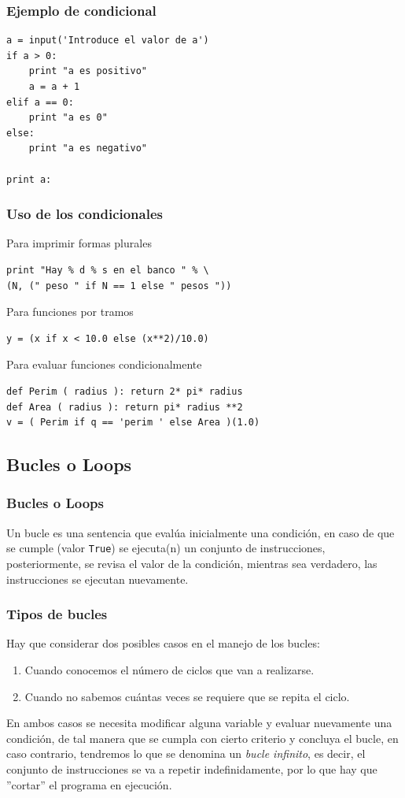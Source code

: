 \begin{frame}[fragile]
\frametitle{Ejemplo de condicional}
\begin{lstlisting}
a = input('Introduce el valor de a')
if a > 0:
    print "a es positivo"
    a = a + 1
elif a == 0:
    print "a es 0"
else:
    print "a es negativo"

print a:
\end{lstlisting}
\end{frame}
\begin{frame}[fragile]
\frametitle{Uso de los condicionales}
Para imprimir formas plurales
\begin{lstlisting}
print "Hay % d % s en el banco " % \
(N, (" peso " if N == 1 else " pesos "))
\end{lstlisting}
\pause
Para funciones por tramos
\begin{lstlisting}
y = (x if x < 10.0 else (x**2)/10.0)
\end{lstlisting}
\pause
Para evaluar funciones condicionalmente
\begin{lstlisting}
def Perim ( radius ): return 2* pi* radius
def Area ( radius ): return pi* radius **2
v = ( Perim if q == 'perim ' else Area )(1.0)
\end{lstlisting}
\end{frame}
\subsection{Bucles o Loops}
\begin{frame}
\frametitle{Bucles o Loops}
Un bucle es una sentencia que evalúa inicialmente una condición, en caso de que se cumple (valor \texttt{True}) se ejecuta(n) un conjunto de instrucciones, posteriormente, se revisa el valor de la condición, mientras sea verdadero, las instrucciones se ejecutan nuevamente.
\end{frame}
\begin{frame}
\frametitle{Tipos de bucles}
Hay que considerar dos posibles casos en el manejo de los bucles:
\begin{enumerate}
\item Cuando conocemos el número de ciclos que van a realizarse.
\item Cuando no sabemos cuántas veces se requiere que se repita el ciclo.
\end{enumerate}
En ambos casos se necesita modificar alguna variable y evaluar nuevamente una condición, de tal manera que se cumpla con cierto criterio y concluya el bucle, en caso contrario, tendremos lo que se denomina un \emph{bucle infinito}, es decir, el conjunto de instrucciones se va a repetir indefinidamente, por lo que hay que ''cortar'' el programa en ejecución.
\end{frame}
